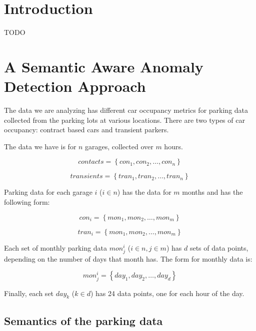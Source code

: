 \documentclass[10pt]{sigplanconf}
\begin{document}
\section{Introduction}
TODO
\section{A Semantic Aware Anomaly Detection Approach}

The data we are analyzing has different car occupancy metrics for parking data collected from the parking lots at various locations.  There are two types of car occupancy: contract based cars and transient parkers.

The data we have is for $n$ garages, collected over $m$ hours.

\begin{equation}
contacts = \left \{   con_1, con_2, \ldots , con_n \right \}
\end{equation}

\begin{equation}
transients =   \left \{  tran_1, tran_2, \ldots , tran_n \right \}
\end{equation}

Parking data for each garage $i$ ($i \in n$) has the data for $m$ months and has the following form:

\begin{equation}
con_i =   \left \{  mon_1, mon_2, \ldots , mon_m \right \}
\end{equation}

\begin{equation}
tran_i =   \left \{  mon_1, mon_2, \ldots , mon_m \right \}
\end{equation}

Each set of monthly parking data $mon_{j}^{i}$ ($i \in n , j \in m$) has $d$ sets of data points, depending on the number of days that month has.  The form for monthly data is:

\begin{equation}
mon_{j}^{i} =   \left \{  day_1, day_2, \ldots , day_d \right \}
\end{equation}

Finally, each set $day_k$ ($k \in d$) has 24 data points, one for each hour of the day.

\subsection{Semantics of the parking data}
\end{document}
